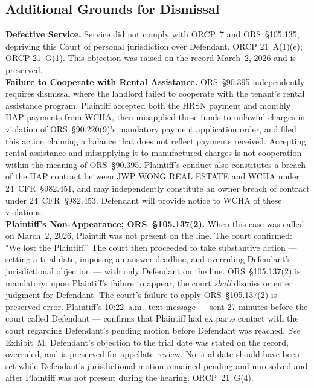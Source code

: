 \documentclass[10pt,letterpaper,oneside]{extarticle}
\begin{document}
\subsection{\textbf{Additional Grounds for Dismissal}}
\textbf{Defective Service.}
Service did not comply with ORCP~7 and ORS~\S105.135,
depriving this Court of personal jurisdiction over
Defendant. ORCP 21~A(1)(e); ORCP 21~G(1). This objection
was raised on the record March~2, 2026 and is preserved.\\
\textbf{Failure to Cooperate with Rental Assistance.}
ORS~\S90.395 independently requires dismissal where the
landlord failed to cooperate with the tenant's rental
assistance program. Plaintiff accepted both the HRSN
payment and monthly HAP payments from WCHA, then
misapplied those funds to unlawful charges in violation of
ORS~\S90.220(9)'s mandatory payment application order, and
filed this action claiming a balance that does not reflect
payments received. Accepting rental assistance and
misapplying it to manufactured charges is not cooperation
within the meaning of ORS~\S90.395. Plaintiff's conduct
also constitutes a breach of the HAP contract between JWP
WONG REAL ESTATE and WCHA under 24~CFR~\S982.451, and may
independently constitute an owner breach of contract under
24~CFR~\S982.453. Defendant will provide notice to WCHA of
these violations.\\
\textbf{Plaintiff's Non-Appearance; ORS~\S105.137(2).}
When this case was called on March~2, 2026, Plaintiff was
not present on the line. The court confirmed: "We lost the
Plaintiff.'' The court then proceeded to take substantive
action --- setting a trial date, imposing an answer
deadline, and overruling Defendant's jurisdictional
objection --- with only Defendant on the line.
ORS~\S105.137(2) is mandatory: upon Plaintiff's failure to
appear, the court \textit{shall} dismiss or enter judgment
for Defendant. The court's failure to apply
ORS~\S105.137(2) is preserved error. Plaintiff's 10:22~a.m.\
text message --- sent 27 minutes before the court called
Defendant --- confirms that Plaintiff had ex parte contact
with the court regarding Defendant's pending motion before
Defendant was reached. \textit{See} Exhibit~M. Defendant's
objection to the trial date was stated on the record,
overruled, and is preserved for appellate review. No trial
date should have been set while Defendant's jurisdictional
motion remained pending and unresolved and after Plaintiff was not present during the hearing. ORCP~21~G(4).
\end{document}
